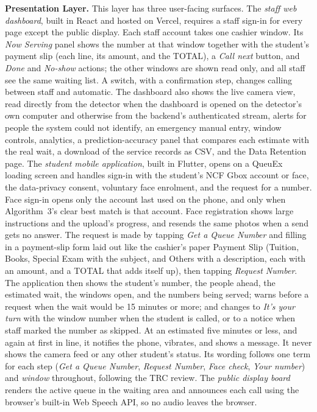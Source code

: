 \documentclass{research}
\newcommand{\sysname}{QueuEx}
\begin{document}
\textbf{Presentation Layer.}\label{cr:presentation} This layer has three user-facing surfaces.
The \emph{staff web dashboard}, built in React and hosted on Vercel,
requires a staff sign-in for every page except the public display. Each
staff account takes one cashier window. Its \emph{Now Serving} panel
shows the number at that window together with the student's payment slip
(each line, its amount, and the TOTAL), a \emph{Call next} button, and
\emph{Done} and \emph{No-show} actions; the other windows are shown read
only, and all staff see the same waiting list. A switch, with a
confirmation step, changes calling between staff and automatic. The
dashboard also shows the live camera view, read directly from the
detector when the dashboard is opened on the detector's own computer and
otherwise from the backend's authenticated stream, alerts for people the system could not
identify, an emergency manual entry, window controls, analytics, a
prediction-accuracy panel that compares each estimate with the real
wait, a download of the service records as CSV, and the Data Retention
page. The \emph{student mobile application}, built in Flutter, opens on a
\sysname{} loading screen and handles sign-in with the student's NCF Gbox
account or face, the data-privacy consent, voluntary face enrolment, and
the request for a number. Face sign-in opens only the account last used
on the phone, and only when Algorithm~3's
clear best match is that account. Face registration shows large
instructions and the upload's progress, and resends the same photos when
a send gets no answer. The request is made by tapping \emph{Get a
Queue Number} and filling in a payment-slip form laid out like the
cashier's paper Payment Slip (Tuition, Books, Special Exam with the
subject, and Others with a description, each with an amount, and a
TOTAL that adds itself up), then tapping \emph{Request Number}. The
application then shows the student's number, the people ahead, the
estimated wait, the windows open, and the numbers being served; warns
before a request when the wait would be 15 minutes or more; and changes
to \emph{It's your turn} with the window number when the student is
called, or to a notice when staff marked the number as skipped. At an
estimated five minutes or less, and again at first in line, it notifies
the phone, vibrates, and shows a message. It never
shows the camera feed or any other student's status. Its wording follows
one term for each step (\emph{Get a Queue Number}, \emph{Request
Number}, \emph{Face check}, \emph{Your number}) and \emph{window}
throughout, following the TRC review. The \emph{public display board}
renders the active queue in the waiting area and announces each call
using the browser's built-in Web Speech API, so no audio leaves the
browser.
\end{document}
